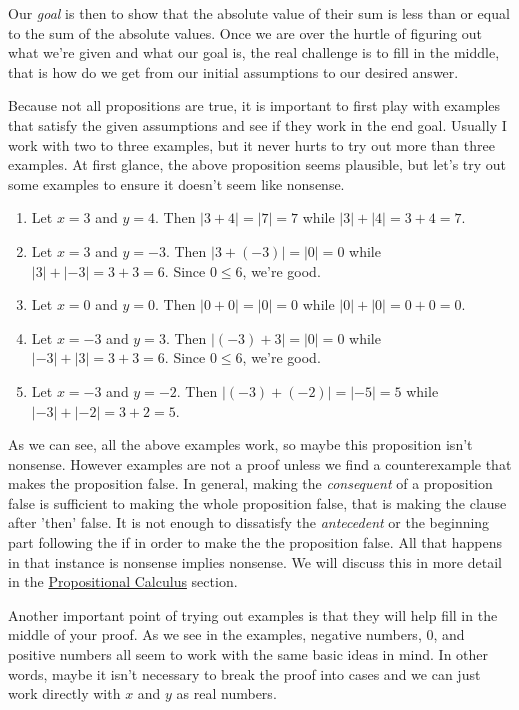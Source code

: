 \documentclass[12pt]{book}
\begin{document}
	Our \textit{goal} is then to show that the absolute value of their sum is less than or equal to the sum of the absolute values. Once we are over the hurtle of figuring out what we're given and what our goal is, the real challenge is to fill in the middle, that is how do we get from our initial assumptions to our desired answer. 
	
	Because not all propositions are true, it is important to first play with examples that satisfy the given assumptions and see if they work in the end goal. Usually I work with two to three examples, but it never hurts to try out more than three examples. At first glance, the above proposition seems plausible, but let's try out some examples to ensure it doesn't seem like nonsense.\\
\begin{enumerate}[nolistsep]
\item Let $x=3$ and $y=4$. Then $|3+4|=|7|=7$ while $|3|+|4|=3+4=7$.
\item Let $x=3$ and $y=-3$. Then $|3+(-3)|=|0|=0$ while $|3|+|-3|=3+3=6$. Since $0\leq 6$, we're good.
\item Let $x=0$ and $y=0$. Then $|0+0|=|0|=0$ while $|0|+|0|=0+0=0$.
\item Let $x=-3$ and $y=3$. Then $|(-3)+3|=|0|=0$ while $|-3|+|3|=3+3=6$. Since $0\leq 6$, we're good.
\item Let $x=-3$ and $y=-2$. Then $|(-3)+(-2)|=|-5|=5$ while $|-3|+|-2|=3+2=5$.\\
\end{enumerate}

	As we can see, all the above examples work, so maybe this proposition isn't nonsense. However examples are not a proof unless we find a counterexample that makes the proposition false. In general, making the \textit{consequent} of a proposition false is sufficient to making the whole proposition false, that is making the clause after 'then' false. It is not enough to dissatisfy the \textit{antecedent} or the beginning part following the if in order to make the the proposition false. All that happens in that instance is nonsense implies nonsense. We will discuss this in more detail in the \hyperref[sec:propcalc]{Propositional Calculus} section.
	 
	Another important point of trying out examples is that they will help fill in the middle of your proof. As we see in the examples, negative numbers, 0, and positive numbers all seem to work with the same basic ideas in mind. In other words, maybe it isn't necessary to break the proof into cases and we can just work directly with $x$ and $y$ as real numbers.
	
\end{document}
